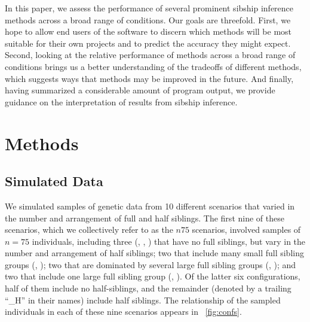 \documentclass[11pt]{article}
\begin{document}
In this paper, we assess the performance of several prominent sibship inference methods across a broad 
range of conditions.  Our goals are threefold. First, we hope to allow end users of the software to 
discern which methods will be most suitable for their own projects and to predict the accuracy they 
might expect.  Second, looking at the relative performance of methods across a broad range of 
conditions brings us a better understanding of the tradeoffs of different methods, which suggests ways 
that methods may be improved in the future. And finally, having summarized a considerable amount of 
program output, we provide guidance on the interpretation of results from sibship inference.
  

\section{Methods}
\subsection{Simulated Data}
We simulated samples of genetic data from 10 different scenarios that varied in the number and 
arrangement of full and half siblings.  The first nine of these scenarios, which we collectively refer 
to as the $n75$ scenarios, involved samples of $n=75$ individuals, including three (\nosibs{}, 
\allhalf{}, \allpathalf) that have no full siblings, but vary in the number and arrangement of half 
siblings; two that include many small full sibling groups (\sfsnoh{}, \sfswh{}); two that are dominated 
by several large full sibling groups (\slfsgnoh{}, \slfsgwh{}); and two that include one large full 
sibling group (\onelargenoh{}, \onelargewh{}).  Of the latter six configurations, half of them include 
no half-siblings, and the remainder (denoted by a trailing ``\_H'' in their names) include half 
siblings.   The relationship of the sampled individuals in each of these nine scenarios appears in 
\FIG~\ref{fig:confs}.
\end{document}
